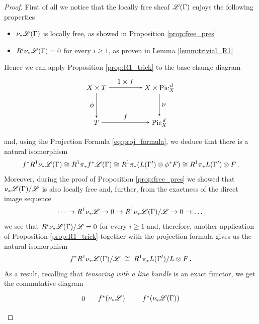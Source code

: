 	\begin{proof}
		First of all we notice that the locally free sheaf $\scL(\Gamma)$ enjoys the following properties 
		\begin{itemize}
			\item $\nu_{*} \scL(\Gamma)$ is locally free, as showed in Proposition \ref{prop:free_pres}
			\item $R^i \nu_{*} \scL(\Gamma) = 0$ for every $i\geq 1$, as proven in Lemma \ref{lemm:trivial_R1}
		\end{itemize}
		Hence we can apply Proposition \ref{prop:R1_trick} to the base change diagram
		$$
		\begin{tikzpicture}[node distance=5em, auto]
			\node (A) 															{$X\times T$};
			\node (B) 	[right of=A, xshift=4em]		{$X\times \Pd$};
		  \node (C) 	[below of=A]	 							{$T$};
		  \node (D) 	[below of=B] 								{$\Pd$};
		  \draw[-stealth] 				(A)		to node {$1\times f$} (B);
		  \draw[-stealth]					(C)		to node {$f$} 				(D);
		  \draw[-stealth][swap]		(A)		to node {$\phi$} 			(C);
		  \draw[-stealth]					(B)		to node {$\nu$} 			(D);
		\end{tikzpicture}
		$$
		and, using the Projection Formula \eqref{eq:proj_formula}, we deduce that there is a natural isomorphism
		\begin{equation}
			f^* R^1 \nu_{*} \mathscr{L}(\Gamma) \cong  R^1 \pi_* f^* \mathscr{L}(\Gamma) \cong R^1 \pi_* (L(\Gamma')\otimes \phi^*F ) \cong R^1 \pi_* L(\Gamma') \otimes F \,.
		\end{equation}
		Moreover, during the proof of Proposition \ref{prop:free_pres} we showed that $\nu_{*} \scL(\Gamma)/\scL $ is also locally free and, further, from the exactness of the direct image sequence
		$$ 
			\dots \to R^1 \nu_{*} \scL \to 0 \to R^1 \nu_{*} \scL(\Gamma)/\scL \to 0 \to \dots
		$$
		we see that $R^i \nu_{*} \scL(\Gamma)/\scL = 0$ for every $i\geq 1$ and, therefore, another application of Proposition \ref{prop:R1_trick} together with the projection formula gives us the natural isomorphism
		$$
			f^* R^1 \nu_{*} \scL(\Gamma)/\scL \; \cong \;  R^1 \pi_* L(\Gamma')/L \otimes F \,.
		$$
		As a result, recalling that \emph{tensoring with a line bundle} is an exact functor, we get the commutative diagram
		$$
		\begin{tikzpicture}[node distance=8em, auto]
			\node (O) 																{$0$};
			\node (A) 	[right of=O, xshift=-4em]			{$f^* (\nu_{*}\scL)$};
			\node (B) 	[right of=A, xshift=-1em]			{$f^* (\nu_{*} \scL(\Gamma))$};

\end{tikzpicture}$$
\end{proof}
